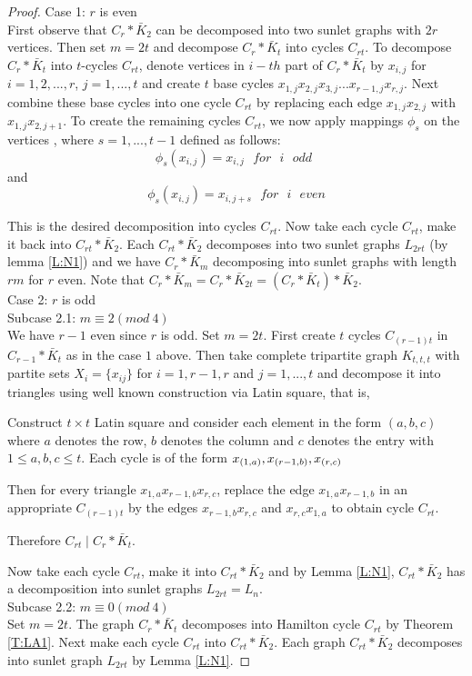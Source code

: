 \documentclass[12pt]{report}
\begin{document}
\begin{proof}
Case 1: $r$ is even\\
First observe that $C_{r}*\bar{K}_{2}$ can be decomposed into two
sunlet graphs with $2r$ vertices. Then set $m=2t$ and decompose
$C_{r}*\bar{K}_{t}$
into cycles $C_{rt}$. To decompose $C_r*\bar{K}_t$ into $t$-cycles $C_{rt}$, denote vertices in $i-th$ part of $C_{r}*\bar{K}%
_{t}$ by $x_{i,j}$ for $i=1,2,...,r$, $j=1,...,t$ and create $t$ base cycles $%
x_{1,j}x_{2,j}x_{3,j}...x_{r-1,j}x_{r,j}$. Next combine these base
cycles into one cycle $C_{rt}$ by replacing each edge
$x_{1,j}x_{2,j}$ with $x_{1,j}x_{2,j+1}$. To create the remaining
cycles $C_{rt}$, we now apply mappings $\phi _{s}$ on the vertices ,
where $s=1,...,t-1$ defined as follows:
$$\phi _{s}\left( x_{i,j}\right) =x_{i,j}\ \ \ for \ \ \  i\ \ \ odd\ \ $$ and
$$\phi _{s}\left( x_{i,j}\right) =x_{i,j+s}\ \ \ for\  \ \ i\ \ \  even$$

This is the desired decomposition into cycles $C_{rt}$. Now take each cycle $%
C_{rt}$, make it back into $C_{rt}*\bar{K}_{2}$. Each
$C_{rt}*\bar{K}_{2}$ decomposes  into two sunlet graphs $L_{2rt}$
(by lemma \ref{L:N1}) and we have $C_r*\bar{K}_m$ decomposing into
sunlet graphs with length $rm$ for $r$ even. Note that
$C_r*\bar{K}_m=C_r*\bar{K}_{2t}=(C_r*\bar{K}_t)*\bar{K}_2$.\\
Case 2: $r$ is odd\\
Subcase 2.1: $m\equiv 2(mod\ 4)$\\
We have $r-1$ even since $r$ is odd. Set $m=2t$. First create $t$ cycles $%
C_{(r-1)t}$ in $C_{r-1}*\bar{K}_{t}$ as in the case $1$ above. Then
take complete
tripartite graph $K_{t,t,t}$ with partite sets $X_{i}=\{x_{ij}\}$ for $%
i=1,r-1,r$ and $j=1,...,t$ and decompose it into triangles using
well known construction via Latin square, that is,

Construct $t\times t$ Latin square and consider each element in the form $%
\left( a,b,c\right) $ where $a$ denotes the row, $b$ denotes the column and $%
c $ denotes the entry with $1\leq a,b,c\leq t$. Each cycle is of the form $x_{%
\left( 1,a\right)} ,x_{\left( r-1,b\right)} ,x_{\left( r,c\right)} $

Then for every triangle $x_{1,a}x_{r-1,b}x_{r,c}$,  replace the edge $%
x_{1,a}x_{r-1,b}$ in an appropriate $C_{(r-1)t}$ by the edges
$x_{r-1,b}x_{r,c}$ and $x_{r,c}x_{1,a}$ to obtain cycle $C_{rt}$.

Therefore $C_{rt}\mid C_{r}*\bar{K}_{t}$.

Now take each cycle  $C_{rt}$, make it into $C_{rt}*\bar{K}_{2}$ and by Lemma \ref{L:N1}, $C_{rt}*\bar{K}_{2}$ has a decomposition into sunlet graphs $L_{2rt}=L_n$.\\
Subcase 2.2:  $m\equiv 0(mod\ 4)$\\
Set $m=2t$. The graph $C_r*\bar{K}_t$ decomposes into Hamilton cycle
$C_{rt}$ by Theorem  \ref{T:LA1}. Next make each cycle $C_{rt}$ into
$C_{rt}*\bar{K}_2$. Each graph $C_{rt}*\bar{K}_2$ decomposes into
sunlet graph $L_{2rt}$ by Lemma \ref{L:N1}.
\end{proof}
\end{document}
